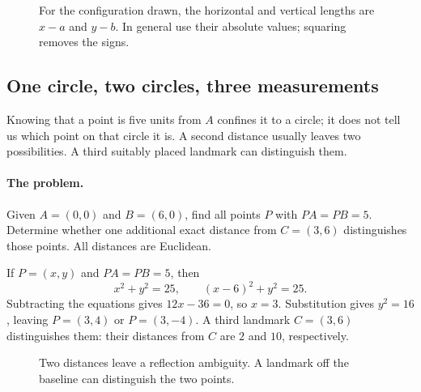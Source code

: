\begin{figure}[htbp]\centering
{}
\caption{For the configuration drawn, the horizontal and vertical lengths are $x-a$ and $y-b$. In general use their absolute values; squaring removes the signs.}
\end{figure}

\subsection{One circle, two circles, three measurements}
Knowing that a point is five units from $A$ confines it to a circle;
it does not tell us which point on that circle it is. A second distance
usually leaves two possibilities. A third suitably placed landmark can
distinguish them.

\paragraph{The problem.}
Given $A=(0,0)$ and $B=(6,0)$, find all points $P$ with $PA=PB=5$.
Determine whether one additional exact distance from $C=(3,6)$
distinguishes those points. All distances are Euclidean.

If $P=(x,y)$ and $PA=PB=5$, then
\[
x^2+y^2=25,\qquad(x-6)^2+y^2=25.
\]
Subtracting the equations gives $12x-36=0$, so $x=3$. Substitution gives
$y^2=16$, leaving $P=(3,4)$ or $P=(3,-4)$.
A third landmark $C=(3,6)$ distinguishes them: their distances from $C$
are $2$ and $10$, respectively.

\begin{figure}[htbp]\centering
{}
\caption{Two distances leave a reflection ambiguity. A landmark off the baseline can distinguish the two points.}
\end{figure}

